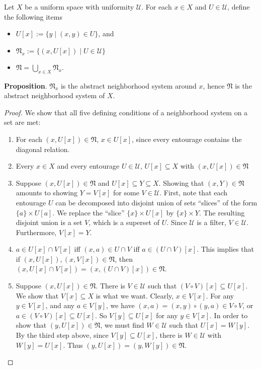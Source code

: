 \documentclass[12pt]{article}
\begin{document}
Let $X$ be a uniform space with uniformity $\mathcal{U}$.  For each $x\in X$ and $U\in \mathcal{U}$, define the following items
\begin{itemize}
\item $U[x]:=\lbrace y\mid (x,y)\in U\rbrace$, and
\item $\mathfrak{N}_x:=\lbrace (x,U[x])\mid U\in \mathcal{U}\rbrace$
\item $\mathfrak{N}=\bigcup_{x\in X} \mathfrak{N}_x$.
\end{itemize}
\textbf{Proposition}.  $\mathfrak{N}_x$ is the abstract neighborhood system around $x$, hence $\mathfrak{N}$ is the abstract neighborhood system of $X$.
\begin{proof}  We show that all five defining conditions of a neighborhood system on a set are met:
\begin{enumerate}
\item
For each $(x,U[x])\in \mathfrak{N}$, $x\in U[x]$, since every entourage contains the diagonal relation.
\item
Every $x\in X$ and every entourage $U\in \mathcal{U}$, $U[x]\subseteq X$ with $(x,U[x])\in \mathfrak{N}$
\item
Suppose $(x,U[x])\in \mathfrak{N}$ and $U[x]\subseteq Y\subseteq X$.  Showing that $(x,Y)\in\mathfrak{N}$ amounts to showing $Y=V[x]$ for some $V\in \mathcal{U}$.  First, note that each entourage $U$ can be decomposed into disjoint union of sets ``slices'' of the form $\lbrace a\rbrace \times U[a]$.  We replace the ``slice'' $\lbrace x\rbrace \times U[x]$ by $\lbrace x\rbrace \times Y$.  The resulting disjoint union is a set $V$, which is a superset of $U$.  Since $\mathcal{U}$ is a filter, $V\in \mathcal{U}$.  Furthermore, $V[x]=Y$.
\item $a\in U[x]\cap V[x]$ iff $(x,a)\in U\cap V$ iff $a\in (U\cap V)[x]$.  This implies that if $(x,U[x]),(x,V[x])\in \mathfrak{N}$, then $(x,U[x]\cap V[x]) = (x,(U\cap V)[x])\in \mathfrak{N}$.
\item Suppose $(x,U[x])\in \mathfrak{N}$.  There is $V\in\mathcal{U}$ such that $(V\circ V)[x]\subseteq U[x]$.  We show that $V[x]\subseteq X$ is what we want.  Clearly, $x\in V[x]$.  For any $y\in V[x]$, and any $a\in V[y]$, we have $(x,a)=(x,y)\circ (y,a)\in V\circ V$, or $a\in (V\circ V)[x]\subseteq U[x]$.  So $V[y]\subseteq U[x]$ for any $y\in V[x]$.  In order to show that $(y,U[x])\in \mathfrak{N}$, we must find $W \in \mathcal{U}$ such that $U[x]=W[y]$.  By the third step above, since $V[y]\subseteq U[x]$, there is $W\in \mathcal{U}$ with $W[y]=U[x]$.  Thus $(y,U[x])=(y,W[y])\in \mathfrak{N}$.
\end{enumerate}
\end{proof}
\end{document}
